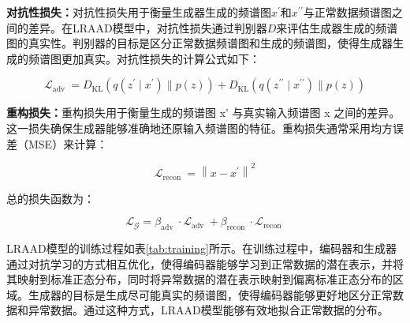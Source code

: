 \documentclass{article}
\begin{document}
\textbf{对抗性损失：}对抗性损失用于衡量生成器生成的频谱图$x^\prime$和$x^{\prime \prime}$与正常数据频谱图之间的差异。在LRAAD模型中，对抗性损失通过判别器$D$来评估生成器生成的频谱图的真实性。判别器的目标是区分正常数据频谱图和生成的频谱图，使得生成器生成的频谱图更加真实。对抗性损失的计算公式如下：

\begin{equation}
  \mathcal{L}_{\text {adv }}=D_\mathrm{KL}(q(z^\prime \mid x^\prime) \| p(z)) + D_\mathrm{KL}(q(z^{\prime\prime} \mid x^{\prime\prime}) \| p(z))
\end{equation}

\textbf{重构损失：}重构损失用于衡量生成的频谱图 x' 与真实输入频谱图 x 之间的差异。这一损失确保生成器能够准确地还原输入频谱图的特征。重构损失通常采用均方误差（MSE）来计算：

\begin{equation} \label{eq:generator_loss}
  \mathcal{L}_{\text {recon }}=\left\|x-x^{\prime}\right\|^2
\end{equation}

总的损失函数为：

\begin{equation}
  \mathcal{L_G}=\beta_{\text {adv }} \cdot\mathcal{L}_{\text {adv }}+\beta_{\text {recon }} \cdot\mathcal{L}_{\text {recon }}
\end{equation}

LRAAD模型的训练过程如表\ref{tab:training}所示。在训练过程中，编码器和生成器通过对抗学习的方式相互优化，使得编码器能够学习到正常数据的潜在表示，并将其映射到标准正态分布，同时将异常数据的潜在表示映射到偏离标准正态分布的区域。生成器的目标是生成尽可能真实的频谱图，使得编码器能够更好地区分正常数据和异常数据。通过这种方式，LRAAD模型能够有效地拟合正常数据的分布。
\end{document}
